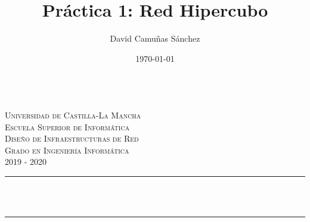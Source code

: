 \documentclass[11pt]{article}
\title{Práctica 1: Red Hipercubo}							%
\author{David Camuñas Sánchez}							%
\date{\today}											%
\makeatletter
\newcommand{\subject}{Diseño de Infraestructuras de Red}						%
\newcommand{\course}{Grado en Ingeniería Informática}	%
\newcommand{\courseyear}{2019 - 2020} 					%
\let\thetitle\@title
\makeatother
\begin{document}

\begin{titlepage}
	\centering
	\begin{minipage}[t]{\textwidth}
		\hspace{\fill}
	\end{minipage}
	\\[2.25 cm]
    \textsc{\LARGE Universidad de Castilla-La Mancha}\\[1 cm]	%
    \textsc{\LARGE Escuela Superior de Informática}\\[2.0 cm]
	\textsc{\Large \subject}\\[0.5 cm]				%
	\textsc{\large \course \\ \courseyear}\\[2 cm]				%
	\rule{\linewidth}{0.2 mm} \\[0.4 cm]
	{ \huge \bfseries \thetitle}\\
	\rule{\linewidth}{0.2 mm} \\[2.5 cm]


\end{titlepage}
\end{document}
